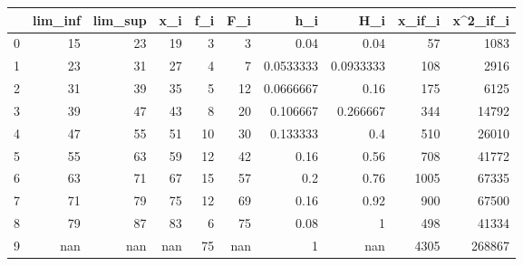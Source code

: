 \documentclass[spanish, 11pt]{exam}
\begin{document}
\begin{questions}
\begin{multicols}{1}
\begin{parts}
\begin{solution}
\begin{tabular}{rrrrrrrrrr}
\hline
    &   lim\_inf &   lim\_sup &   x\_i &   f\_i &   F\_i &       h\_i &         H\_i &   x\_if\_i &   x\^{}2\_if\_i \\
\hline
  0 &        15 &        23 &    19 &     3 &     3 & 0.04      &   0.04      &       57 &       1083 \\
  1 &        23 &        31 &    27 &     4 &     7 & 0.0533333 &   0.0933333 &      108 &       2916 \\
  2 &        31 &        39 &    35 &     5 &    12 & 0.0666667 &   0.16      &      175 &       6125 \\
  3 &        39 &        47 &    43 &     8 &    20 & 0.106667  &   0.266667  &      344 &      14792 \\
  4 &        47 &        55 &    51 &    10 &    30 & 0.133333  &   0.4       &      510 &      26010 \\
  5 &        55 &        63 &    59 &    12 &    42 & 0.16      &   0.56      &      708 &      41772 \\
  6 &        63 &        71 &    67 &    15 &    57 & 0.2       &   0.76      &     1005 &      67335 \\
  7 &        71 &        79 &    75 &    12 &    69 & 0.16      &   0.92      &      900 &      67500 \\
  8 &        79 &        87 &    83 &     6 &    75 & 0.08      &   1         &      498 &      41334 \\
  9 &       nan &       nan &   nan &    75 &   nan & 1         & nan         &     4305 &     268867 \\
\hline

\end{tabular}
\end{solution}
\end{parts}
\end{multicols}
\end{questions}
\end{document}
